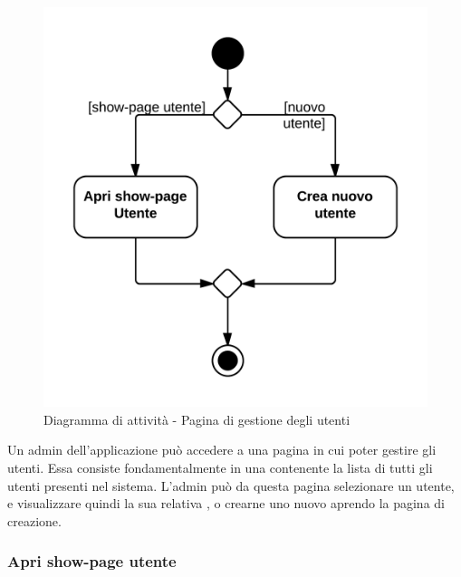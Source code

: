 \begin{figure}[H]
\centering
\includegraphics[scale=0.1]{uml/MaaP - Apri pagina gestione utenti.png}
\caption{Diagramma di attività - Pagina di gestione degli utenti}
\end{figure}

Un admin dell'applicazione può accedere a una pagina in cui poter gestire gli utenti. Essa consiste fondamentalmente in una  contenente la lista di tutti gli utenti presenti nel sistema. L'admin può da questa pagina selezionare un utente, e visualizzare quindi la sua relativa , o crearne uno nuovo aprendo la pagina di creazione.

\subsubsection{Apri show-page utente}

